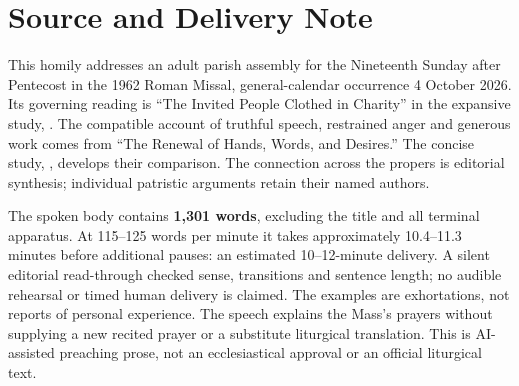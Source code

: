 \section{Source and Delivery Note}

This homily addresses an adult parish assembly for the Nineteenth Sunday
after Pentecost in the 1962 Roman Missal, general-calendar occurrence
4 October 2026. Its governing reading is ``The Invited People Clothed in
Charity'' in the expansive study, .
The compatible account of truthful speech, restrained anger and generous
work comes from ``The Renewal of Hands, Words, and Desires.'' The concise
study, , develops their comparison.
The connection across the propers is editorial synthesis; individual
patristic arguments retain their named authors.

The spoken body contains \textbf{1,301 words}, excluding the title and
all terminal apparatus. At 115--125 words per minute it takes approximately
10.4--11.3 minutes before additional pauses: an estimated 10--12-minute
delivery. A silent editorial read-through checked sense, transitions and
sentence length; no audible rehearsal or timed human delivery is claimed.
The examples are exhortations, not reports of personal experience.
The speech explains the Mass's prayers without supplying a new recited
prayer or a substitute liturgical translation. This is AI-assisted
preaching prose, not an ecclesiastical approval or an official liturgical text.

